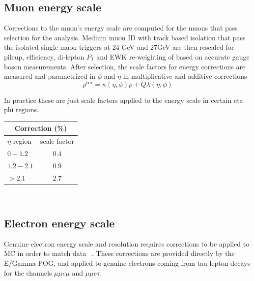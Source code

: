 \subsection{Muon energy scale}
Corrections to the muon's energy scale are computed for the muons that pass selection for the analysis. Medium muon ID with track based isolation that pass the isolated single muon triggers at 24 GeV and 27GeV are then rescaled for pileup, efficiency, di-lepton $P_T$ and EWK re-weighting of based on accurate gauge boson measurements. After selection, the scale factors for energy corrections are measured and parametrized in $\phi$ and $\eta$ in multiplicative and additive corrections 
\[\rho^{\text{cor}}=\kappa(\eta,\phi)\rho+Q \lambda(\eta,\phi)\] 

In practice these are just scale factors applied to the energy scale in certain eta phi regions. \\
\begin{table}[h]
  \begin{center}
    \label{tab:MES}
    \begin{tabular} { l | c }
      \hline \multicolumn{2}{c}{Correction (\%)} \\
      \hline $\eta$ region & scale factor  \\ \hline
      $0 - 1.2$ & $0.4$ \\ 
      $1.2 - 2.1 $& $0.9 $\\ 
      $> 2.1$ & $2.7$ \\ 
    \end{tabular}
  \end{center}
\end{table}\\

\subsection{Electron energy scale}

Genuine electron energy scale and resolution requires corrections to be applied to MC in order to match data ~\cite{EGammaEnergyScale}. These corrections are provided directly by the E/Gamma POG, and applied to genuine electrons coming from tau lepton decays for the channels $\mu\mu e \mu$ and $\mu\mu e \tau$.

